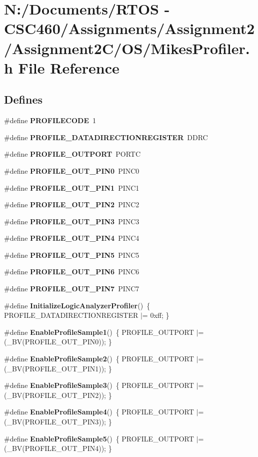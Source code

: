 \section{N:/Documents/RTOS - CSC460/Assignments/Assignment2/Assignment2C/OS/Mikes\-Profiler.h File Reference}
\label{_mikes_profiler_8h}
\subsection*{Defines}
\begin{CompactItemize}
\item 
\#define {\bf PROFILECODE}~1
\item 
\#define {\bf PROFILE\_\-DATADIRECTIONREGISTER}~DDRC
\item 
\#define {\bf PROFILE\_\-OUTPORT}~PORTC
\item 
\#define {\bf PROFILE\_\-OUT\_\-PIN0}~PINC0
\item 
\#define {\bf PROFILE\_\-OUT\_\-PIN1}~PINC1
\item 
\#define {\bf PROFILE\_\-OUT\_\-PIN2}~PINC2
\item 
\#define {\bf PROFILE\_\-OUT\_\-PIN3}~PINC3
\item 
\#define {\bf PROFILE\_\-OUT\_\-PIN4}~PINC4
\item 
\#define {\bf PROFILE\_\-OUT\_\-PIN5}~PINC5
\item 
\#define {\bf PROFILE\_\-OUT\_\-PIN6}~PINC6
\item 
\#define {\bf PROFILE\_\-OUT\_\-PIN7}~PINC7
\item 
\#define {\bf Initialize\-Logic\-Analyzer\-Profiler}()~\{ PROFILE\_\-DATADIRECTIONREGISTER $|$= 0xff; \}
\item 
\#define {\bf Enable\-Profile\-Sample1}()~\{ PROFILE\_\-OUTPORT $|$= (\_\-BV(PROFILE\_\-OUT\_\-PIN0)); \}
\item 
\#define {\bf Enable\-Profile\-Sample2}()~\{ PROFILE\_\-OUTPORT $|$= (\_\-BV(PROFILE\_\-OUT\_\-PIN1)); \}
\item 
\#define {\bf Enable\-Profile\-Sample3}()~\{ PROFILE\_\-OUTPORT $|$= (\_\-BV(PROFILE\_\-OUT\_\-PIN2)); \}
\item 
\#define {\bf Enable\-Profile\-Sample4}()~\{ PROFILE\_\-OUTPORT $|$= (\_\-BV(PROFILE\_\-OUT\_\-PIN3)); \}
\item 
\#define {\bf Enable\-Profile\-Sample5}()~\{ PROFILE\_\-OUTPORT $|$= (\_\-BV(PROFILE\_\-OUT\_\-PIN4)); \}

\end{CompactItemize}
